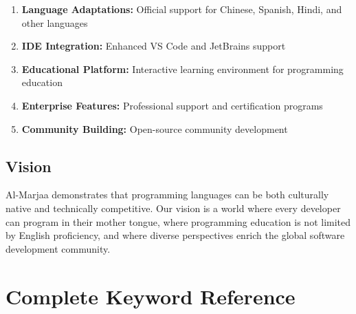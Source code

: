 \documentclass[11pt,a4paper]{article}
\begin{document}
\begin{enumerate}
    \item \textbf{Language Adaptations:} Official support for Chinese, Spanish, Hindi, and other languages
    \item \textbf{IDE Integration:} Enhanced VS Code and JetBrains support
    \item \textbf{Educational Platform:} Interactive learning environment for programming education
    \item \textbf{Enterprise Features:} Professional support and certification programs
    \item \textbf{Community Building:} Open-source community development
\end{enumerate}

\subsection{Vision}

Al-Marjaa demonstrates that programming languages can be both culturally native and technically competitive. Our vision is a world where every developer can program in their mother tongue, where programming education is not limited by English proficiency, and where diverse perspectives enrich the global software development community.

\newpage
\appendix

\section{Complete Keyword Reference}
\label{app:keywords}
\end{document}

